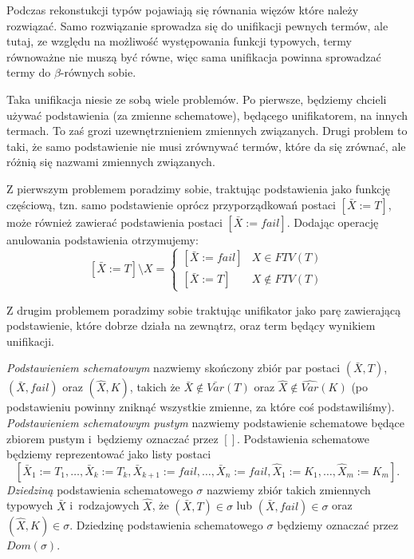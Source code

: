 \documentclass[11pt,leqno]{article}
\begin{document}
Podczas rekonstukcji typów pojawiają się równania więzów które należy rozwiązać. Samo rozwiązanie
sprowadza się do unifikacji pewnych termów, ale tutaj, ze względu na możliwość występowania funkcji
typowych, termy równoważne nie muszą być równe, więc sama unifikacja powinna sprowadzać termy do
$\beta$-równych sobie.

Taka unifikacja niesie ze sobą wiele problemów. Po pierwsze, będziemy chcieli używać podstawienia (za zmienne schematowe),
będącego unifikatorem, na innych termach. To zaś grozi uzewnętrznieniem zmiennych związanych. Drugi
problem to taki, że samo podstawienie nie musi zrównywać termów, które da się zrównać, ale różnią się
nazwami zmiennych związanych.

Z pierwszym problemem poradzimy sobie, traktując podstawienia jako funkcję częściową, tzn. samo podstawienie
oprócz przyporządkowań postaci $[\bar{X} := T]$, może również zawierać podstawienia postaci $[\bar{X} := fail]$.
Dodając operację anulowania podstawienia otrzymujemy:
\[
[\bar{X} := T] \setminus X = 
\begin{cases}
[\bar{X} := fail] & X \in    FTV(T) \\
[\bar{X} := T]    & X \notin FTV(T)
\end{cases}
\]

Z drugim problemem poradzimy sobie traktując unifikator jako parę zawierającą podstawienie, które dobrze działa
na zewnątrz, oraz term będący wynikiem unifikacji.

\begin{definicja}
\emph{Podstawieniem schematowym} nazwiemy skończony zbiór par postaci $(\bar{X},T)$, $(\bar{X},fail)$ oraz $(\widehat{X},K)$, takich że
$\bar{X} \notin \bar{Var}(T)$ oraz $\widehat{X} \notin \widehat{Var}(K)$ (po podstawieniu powinny zniknąć wszystkie zmienne, za 
które coś podstawiliśmy). 
\emph{Podstawieniem schematowym pustym} nazwiemy podstawienie schematowe będące zbiorem pustym i~będziemy oznaczać przez $[]$.
Podstawienia schematowe będziemy reprezentować jako listy postaci
\[
[\bar{X}_1 := T_1, \dots, \bar{X}_k := T_k, \bar{X}_{k+1} := fail, \dots , \bar{X}_n := fail, \widehat{X}_1 := K_1, \dots, \widehat{X}_m := K_m].
\]
\emph{Dziedziną} podstawienia schematowego $\sigma$ nazwiemy zbiór takich zmiennych typowych $\bar{X}$ i~rodzajowych $\widehat{X}$, że
$(\bar{X}, T) \in \sigma$ lub $(\bar{X}, fail) \in \sigma$ oraz $(\widehat{X}, K) \in \sigma$. Dziedzinę podstawienia schematowego $\sigma$
będziemy oznaczać przez $Dom(\sigma)$.
\end{definicja}
\end{document}
